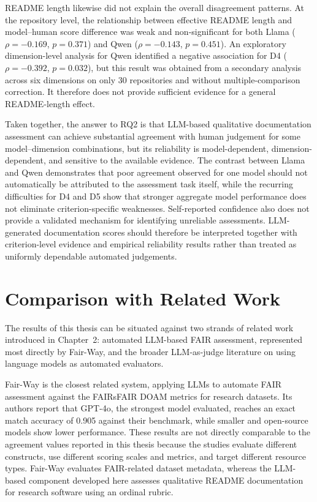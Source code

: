 README length likewise did not explain the overall disagreement
patterns. At the repository level, the relationship between effective
README length and model--human score difference was weak and
non-significant for both Llama ($\rho=-0.169$, $p=0.371$) and Qwen
($\rho=-0.143$, $p=0.451$). An exploratory dimension-level analysis
for Qwen identified a negative association for D4
($\rho=-0.392$, $p=0.032$), but this result was obtained from a
secondary analysis across six dimensions on only 30 repositories and
without multiple-comparison correction. It therefore does not provide
sufficient evidence for a general README-length effect.

Taken together, the answer to RQ2 is that LLM-based qualitative
documentation assessment can achieve substantial agreement with human
judgement for some model--dimension combinations, but its reliability
is model-dependent, dimension-dependent, and sensitive to the
available evidence. The contrast between Llama and Qwen demonstrates
that poor agreement observed for one model should not automatically
be attributed to the assessment task itself, while the recurring
difficulties for D4 and D5 show that stronger aggregate model
performance does not eliminate criterion-specific weaknesses.
Self-reported confidence also does not provide a validated mechanism
for identifying unreliable assessments. LLM-generated documentation
scores should therefore be interpreted together with criterion-level
evidence and empirical reliability results rather than treated as
uniformly dependable automated judgements.

\section{Comparison with Related Work}

The results of this thesis can be situated against two strands of
related work introduced in Chapter~2: automated LLM-based FAIR
assessment, represented most directly by Fair-Way, and the broader
LLM-as-judge literature on using language models as automated
evaluators.

Fair-Way \cite{sharma2025fairway} is the closest related system,
applying LLMs to automate FAIR assessment against the FAIRsFAIR DOAM
metrics for research datasets. Its authors report that GPT-4o, the
strongest model evaluated, reaches an exact match accuracy of 0.905
against their benchmark, while smaller and open-source models show
lower performance. These results are not directly comparable to the
agreement values reported in this thesis because the studies evaluate
different constructs, use different scoring scales and metrics, and
target different resource types. Fair-Way evaluates FAIR-related
dataset metadata, whereas the LLM-based component developed here
assesses qualitative README documentation for research software using
an ordinal rubric.

